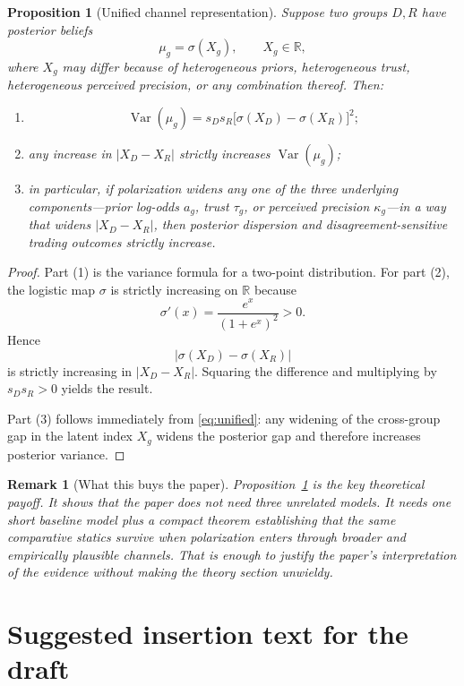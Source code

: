 \documentclass[12pt]{article}
\newtheorem{proposition}{Proposition}
\newtheorem{remark}{Remark}
\begin{document}
\begin{proposition}[Unified channel representation]\label{prop:unified}
Suppose two groups $D,R$ have posterior beliefs
\[
    \mu_g=\sigma(X_g), \qquad X_g\in\mathbb{R},
\]
where $X_g$ may differ because of heterogeneous priors, heterogeneous trust, heterogeneous perceived precision, or any combination thereof. Then:
\begin{enumerate}
    \item
    \[
        \operatorname{Var}(\mu_g)=s_Ds_R\big[\sigma(X_D)-\sigma(X_R)\big]^2;
    \]
    \item any increase in $|X_D-X_R|$ strictly increases $\operatorname{Var}(\mu_g)$;
    \item in particular, if polarization widens any one of the three underlying components---prior log-odds $a_g$, trust $\tau_g$, or perceived precision $\kappa_g$---in a way that widens $|X_D-X_R|$, then posterior dispersion and disagreement-sensitive trading outcomes strictly increase.
\end{enumerate}
\end{proposition}

\begin{proof}
Part (1) is the variance formula for a two-point distribution. For part (2), the logistic map $\sigma$ is strictly increasing on $\mathbb{R}$ because
\[
    \sigma'(x)=\frac{e^x}{(1+e^x)^2}>0.
\]
Hence
\[
    |\sigma(X_D)-\sigma(X_R)|
\]
is strictly increasing in $|X_D-X_R|$. Squaring the difference and multiplying by $s_Ds_R>0$ yields the result.

Part (3) follows immediately from \eqref{eq:unified}: any widening of the cross-group gap in the latent index $X_g$ widens the posterior gap and therefore increases posterior variance.
\end{proof}

\begin{remark}[What this buys the paper]
Proposition~\ref{prop:unified} is the key theoretical payoff. It shows that the paper does not need three unrelated models. It needs one short baseline model plus a compact theorem establishing that the same comparative statics survive when polarization enters through broader and empirically plausible channels. That is enough to justify the paper's interpretation of the evidence without making the theory section unwieldy.
\end{remark}

\section{Suggested insertion text for the draft}
\end{document}
